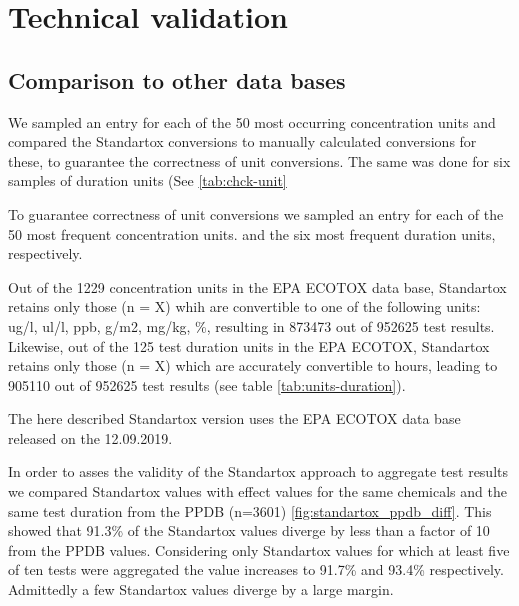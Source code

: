 \section{Technical validation}

\subsection{Comparison to other data bases}

We sampled an entry for each of the 50 most occurring concentration units and compared the Standartox conversions to manually calculated conversions for these, to guarantee the correctness of unit conversions. The same was done for six samples of duration units (See \ref{tab:chck-unit}

To guarantee correctness of unit conversions we sampled an entry for each of the 50 most frequent concentration units. and the six most frequent duration units, respectively.

Out of the 1229 concentration units in the EPA ECOTOX data base, Standartox retains only those (n = X) whih are convertible to one of the following units: ug/l, ul/l, ppb, g/m2, mg/kg, \%, resulting in 873473 out of 952625 test results. Likewise, out of the 125 test duration units in the EPA ECOTOX, Standartox retains only those (n = X) which are accurately convertible to hours, leading to 905110 out of 952625 test results (see table \ref{tab:units-duration}). %

The here described Standartox version uses the EPA ECOTOX data base released on the 12.09.2019.


In order to asses the validity of the Standartox approach to aggregate test results we compared Standartox values with effect values for the same chemicals and the same test duration from the PPDB (n=3601) \ref{fig:standartox_ppdb_diff}. This showed that 91.3\% of the Standartox values diverge by less than a factor of 10 from the PPDB values. Considering only Standartox values for which at least five of ten tests were aggregated the value increases to 91.7\% and 93.4\% respectively. Admittedly a few Standartox values diverge by a large margin.


